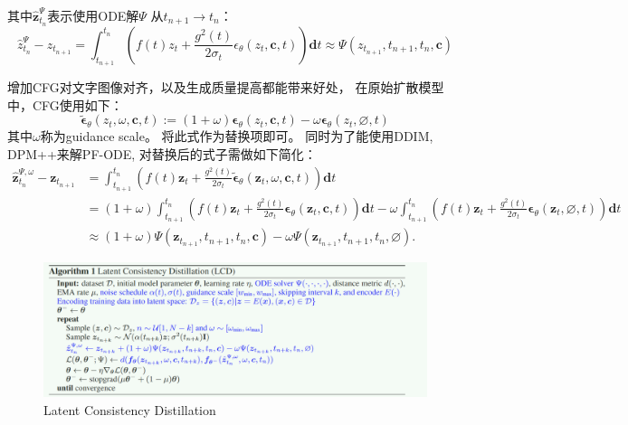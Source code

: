 \documentclass[lang=cn,newtx,10pt,scheme=chinese]{elegantbook}
\begin{document}
其中$\hat{\boldsymbol{z}}_{t_n}^{\Psi}$表示使用ODE解$\Psi$ 从$t_{n+1} \rightarrow t_n$：
\begin{equation}
\hat{z}_{t_n}^{\Psi}-z_{t_{n+1}}=\int_{t_{n+1}}^{t_n}\left(f(t) z_t+\frac{g^2(t)}{2 \sigma_t} \epsilon_\theta\left(z_t, \boldsymbol{c}, t\right)\right) \mathbf{d} t \approx \Psi\left(z_{t_{n+1}}, t_{n+1}, t_n, \boldsymbol{c}\right)
\end{equation}

增加CFG对文字图像对齐，以及生成质量提高都能带来好处， 在原始扩散模型中，CFG使用如下：
\begin{equation}
\tilde{\boldsymbol{\epsilon}}_\theta\left(z_t, \omega, \boldsymbol{c}, t\right):=(1+\omega) \boldsymbol{\epsilon}_\theta\left(z_t, \boldsymbol{c}, t\right)-\omega \boldsymbol{\epsilon}_\theta\left(z_t, \varnothing, t\right)
\end{equation}
其中$\omega$称为guidance scale。
将此式作为替换项即可。
同时为了能使用DDIM, DPM++来解PF-ODE, 对替换后的式子需做如下简化：
\begin{equation}
\begin{aligned}
\hat{\boldsymbol{z}}_{t_n}^{\Psi, \omega}-\boldsymbol{z}_{t_{n+1}} & =\int_{t_{n+1}}^{t_n}\left(f(t) \boldsymbol{z}_t+\frac{g^2(t)}{2 \sigma_t} \tilde{\boldsymbol{\epsilon}}_\theta\left(\boldsymbol{z}_t, \omega, \boldsymbol{c}, t\right)\right) \mathbf{d} t \\
& =(1+\omega) \int_{t_{n+1}}^{t_n}\left(f(t) \boldsymbol{z}_t+\frac{g^2(t)}{2 \sigma_t} \boldsymbol{\epsilon}_\theta\left(\boldsymbol{z}_t, \boldsymbol{c}, t\right)\right) \mathbf{d} t-
\omega \int_{t_{n+1}}^{t_n}\left(f(t) \boldsymbol{z}_t+\frac{g^2(t)}{2 \sigma_t} \boldsymbol{\epsilon}_\theta\left(\boldsymbol{z}_t, \varnothing, t\right)\right) \mathbf{d} t \\
& \approx(1+\omega) \Psi\left(\boldsymbol{z}_{t_{n+1}}, t_{n+1}, t_n, \boldsymbol{c}\right)-\omega \Psi\left(\boldsymbol{z}_{t_{n+1}}, t_{n+1}, t_n, \varnothing\right) .
\end{aligned}
\end{equation}

\begin{figure}[h!]
\centering
\includegraphics[scale=0.7]{image/LCD.jpg}
\caption{Latent Consistency Distillation}
\label{fig:LCD}
\end{figure}
\end{document}
